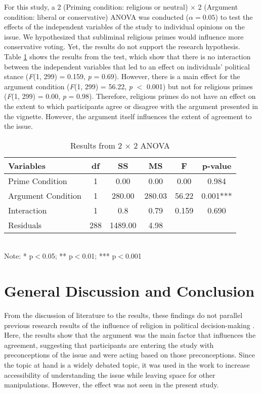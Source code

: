 \documentclass[letterpaper,man,natbib,noextraspace,12pt]{apa6}  %
\newcommand\e{\emph}
\newcommand\tb{\textbf}
\begin{document}
For this study, a 2 (Priming condition: religious or neutral) $\times$ 2 (Argument condition: liberal or conservative) ANOVA was conducted ($\alpha = 0.05$) to test the effects of the independent variables of the study to individual opinions on the issue. We hypothesized that subliminal religious primes would influence more conservative voting. Yet, the results do not support the research hypothesis. Table \ref{AnovaResults} shows the results from the test, which show that there is no interaction between the independent variables that led to an effect on individuals' political stance (\e{F}(1, 299) = 0.159, \e{p} = 0.69). However, there is a main effect for the argument condition (\e{F}(1, 299) = 56.22, \e{p} $<$ 0.001) but not for religious primes (\e{F}(1, 299) = 0.00, \e{p} = 0.98). Therefore, religious primes do not have an effect on the extent to which participants agree or disagree with the argument presented in the vignette. However, the argument itself influences the extent of agreement to the issue. 

\begin{table}
	\caption{Results from 2 $\times$ 2 ANOVA}\label{AnovaResults}
	\begin{tabular}{lccccc}
		\hline
		\tb{Variables}&\tb{df}&\tb{SS}&\tb{MS}&\tb{F}&\tb{p-value}\\
		\hline
		Prime Condition&1&0.00&0.00&0.00&0.984\\
		Argument Condition&1&280.00&280.03&56.22&0.001***\\
		Interaction&1&0.8&0.79&0.159&0.690\\
		Residuals&288&1489.00&4.98&&\\
		\hline
	\end{tabular}\\
	Note: * p$<$0.05; ** p$<$0.01; *** p$<$0.001
\end{table}

\section{General Discussion and Conclusion}

From the discussion of literature to the results, these findings do not parallel previous research results of the influence of religion in political decision-making \citep{calfano_god_2009, rutchick_deus_2010}. Here, the results show that the argument was the main factor that influences the agreement, suggesting that participants are entering the study with preconceptions of the issue and were acting based on those preconceptions. Since the topic at hand is a widely debated topic, it was used in the \cite{suhay_role_2018} work to increase accessibility of understanding the issue while leaving space for other manipulations. However, the effect was not seen in the present study.
\end{document}
